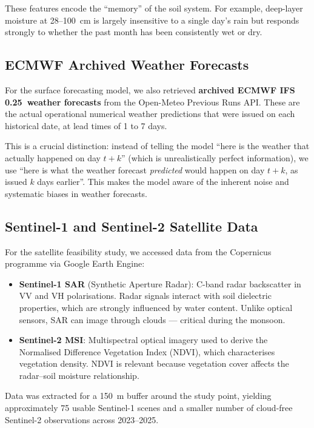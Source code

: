 \documentclass[12pt, a4paper]{article}
\begin{document}
These features encode the ``memory'' of the soil system. For example, deep-layer moisture at 28--100~cm is largely insensitive to a single day's rain but responds strongly to whether the past month has been consistently wet or dry.

\subsection{ECMWF Archived Weather Forecasts}

For the surface forecasting model, we also retrieved \textbf{archived ECMWF IFS 0.25\textdegree\ weather forecasts} from the Open-Meteo Previous Runs API. These are the actual operational numerical weather predictions that were issued on each historical date, at lead times of 1 to 7 days.

This is a crucial distinction: instead of telling the model ``here is the weather that actually happened on day $t+k$'' (which is unrealistically perfect information), we use ``here is what the weather forecast \textit{predicted} would happen on day $t+k$, as issued $k$ days earlier''. This makes the model aware of the inherent noise and systematic biases in weather forecasts.

\subsection{Sentinel-1 and Sentinel-2 Satellite Data}

For the satellite feasibility study, we accessed data from the Copernicus programme via Google Earth Engine:

\begin{itemize}
    \item \textbf{Sentinel-1 SAR} (Synthetic Aperture Radar): C-band radar backscatter in VV and VH polarisations. Radar signals interact with soil dielectric properties, which are strongly influenced by water content. Unlike optical sensors, SAR can image through clouds --- critical during the monsoon.
    
    \item \textbf{Sentinel-2 MSI}: Multispectral optical imagery used to derive the Normalised Difference Vegetation Index (NDVI), which characterises vegetation density. NDVI is relevant because vegetation cover affects the radar--soil moisture relationship.
\end{itemize}

Data was extracted for a 150~m buffer around the study point, yielding approximately 75 usable Sentinel-1 scenes and a smaller number of cloud-free Sentinel-2 observations across 2023--2025.
\end{document}
